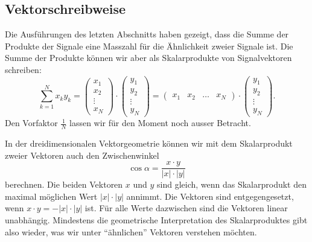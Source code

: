 
\subsection{Vektorschreibweise}
Die Ausführungen des letzten Abschnitts haben gezeigt, dass die Summe der
Produkte der Signale eine Masszahl für die Ähnlichkeit zweier Signale ist.
Die Summe der Produkte können wir aber als Skalarprodukte von Signalvektoren
schreiben:
\[
\sum_{k=1}^N x_ky_k
=
\begin{pmatrix}x_1\\x_2\\\vdots\\x_N\end{pmatrix}
\cdot
\begin{pmatrix}y_1\\y_2\\\vdots\\y_N\end{pmatrix}
=
\begin{pmatrix}x_1&x_2&\dots&x_N\end{pmatrix}
\cdot
\begin{pmatrix}y_1\\y_2\\\vdots\\y_N\end{pmatrix}.
\]
Den Vorfaktor $\frac1{N}$ lassen wir für den Moment noch ausser Betracht.

In der dreidimensionalen Vektorgeometrie können wir mit dem Skalarprodukt
zweier Vektoren auch den Zwischenwinkel
\[
\cos\alpha
=
\frac{
x\cdot y
}{
|x|\cdot |y|
}
\]
berechnen.
Die beiden Vektoren $x$ und $y$ sind gleich, wenn das Skalarprodukt
den maximal möglichen Wert $|x|\cdot |y|$ annimmt.
Die Vektoren sind entgegengesetzt, wenn $x\cdot y=-|x|\cdot |y|$ ist.
Für alle Werte dazwischen sind die Vektoren linear unabhängig.
Mindestens die geometrische Interpretation des Skalarproduktes gibt also
wieder, was wir unter ``ähnlichen'' Vektoren verstehen möchten.

